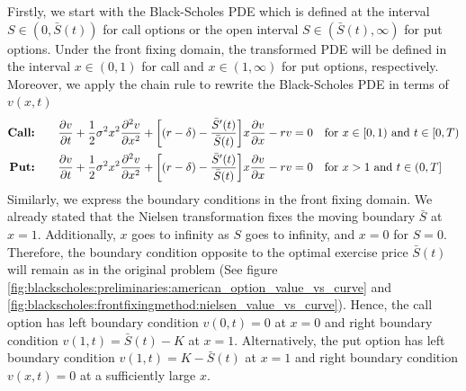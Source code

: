 Firstly, we start with the Black-Scholes PDE which is defined at the interval 
$S\in(0, \bar{S}(t))$ for call options or the open interval $S\in(\bar{S}(t), \infty)$ for put options. Under the front fixing domain, the transformed PDE will be defined in the interval $x\in(0, 1)$ for call and $x\in(1, \infty)$ for put options, respectively. Moreover, we apply the chain rule to rewrite the Black-Scholes PDE in terms of $v(x,t)$
\begin{subequations} \label{eq:blackscholes:frontfixingmethod:nielsen:american_options_pde}
  \begin{align}
    \text{\textbf{Call:}} \qquad
    \dfrac{\partial{v}}{\partial{t}} + \dfrac{1}{2}\sigma^{2} x^2 \dfrac{\partial^2{v}}{\partial{x}^2} + \bigg[(r - \delta) - \dfrac{\bar{S}^\prime(t)}{\bar{S}(t)}\bigg]x\dfrac{\partial{v}}{\partial{x}} - rv = 0 \quad & \text{for $x \in [0, 1)$ and $t \in [0, T)$} \\
    \text{\textbf{Put:}} \qquad
    \dfrac{\partial{v}}{\partial{t}} + \dfrac{1}{2}\sigma^{2} x^2 \dfrac{\partial^2{v}}{\partial{x}^2} + \bigg[(r - \delta) - \dfrac{\bar{S}^\prime(t)}{\bar{S}(t)}\bigg]x\dfrac{\partial{v}}{\partial{x}} - rv = 0 \quad & \text{for $x > 1$ and $t \in (0, T]$}
  \end{align}
\end{subequations}
Similarly, we express the boundary conditions in the front fixing domain. We already stated that the Nielsen transformation fixes the moving boundary $\bar{S}$ at $x=1$. Additionally, $x$ goes to infinity as $S$ goes to infinity, and $x=0$ for $S=0$. Therefore, the boundary condition opposite to the optimal exercise price $\bar{S}(t)$ will remain as in the original problem (See figure \ref{fig:blackscholes:preliminaries:american_option_value_vs_curve} and \ref{fig:blackscholes:frontfixingmethod:nielsen_value_vs_curve}). Hence, the call option has left boundary condition $v(0, t) = 0$ at $x=0$ and right boundary condition $v(1, t) = \bar{S}(t) - K$ at $x=1$. Alternatively, 
the put option has left boundary condition $v(1, t) = K - \bar{S}(t)$ at $x=1$ and right boundary condition $v(x, t) = 0$ at a sufficiently large $x$.
